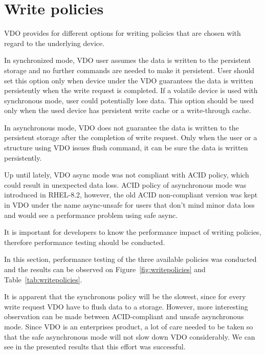 \documentclass[
  color, %
  table, %
  lof,   %
  lot,   %
]{fithesis3}
\begin{document}
\clearpage

\section{Write policies}
VDO provides for different options for writing policies that are chosen with regard to the underlying device. 

In synchronized mode, VDO user assumes the data is written to the persistent storage and no further commands are needed to make it persistent. User should set this option only when device under the VDO guarantees the data is written persistently when the write request is completed. If a volatile device is used with synchronous mode, user could potentially lose data. This option should be used only when the used device has persistent write cache or a write-through cache.

In asynchronous mode, VDO does not guarantee the data is written to the persistent storage after the completion of write request. Only when the user or a structure using VDO issues flush command, it can be sure the data is written persistently.

Up until lately, VDO async mode was not compliant with ACID policy, which could result in unexpected data loss. ACID policy of asynchronous mode was introduced in RHEL-8.2, however, the old ACID non-compliant version was kept in VDO under the name async-unsafe for users that don't mind minor data loss and would see a performance problem using safe async.

It is important for developers to know the performance impact of writing policies, therefore performance testing should be conducted.

In this section, performance testing of the three available policies was conducted and the results can be observed on Figure~\ref{fig:writepolicies} and Table~\ref{tab:writepolicies}.

It is apparent that the synchronous policy will be the slowest, since for every write request VDO have to flush data to a storage. However, more interesting observation can be made between ACID-compliant and unsafe asynchronous mode. Since VDO is an enterprises product, a lot of care needed to be taken so that the safe asynchronous mode will not slow down VDO considerably. We can see in the presented results that this effort was successful.
\end{document}
